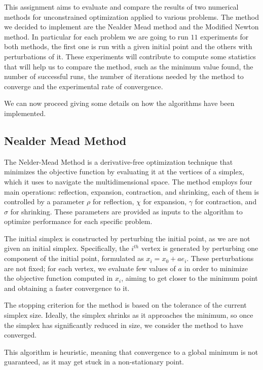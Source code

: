 This assignment aims to evaluate and compare the results of two numerical methods for unconstrained optimization applied to various problems.
The method we decided to implement are the Nealder Mead method and the Modified Newton method. In particular for each problem we are going to run $11$ experiments for both methods, the first one is run with a given initial point and the others with perturbations of it. These experiments will contribute to compute some statistics that will help us to compare the method, such as the minimum value found, the number of successful runs, the number of iterations needed by the method to converge and the experimental rate of convergence.

We can now proceed giving some details on how the algorithms have been implemented.

\subsection*{Nealder Mead Method}
The Nelder-Mead Method is a derivative-free optimization technique that minimizes the objective function by evaluating it at the vertices of a simplex, which it uses to navigate the multidimensional space.
The method employs four main operations: reflection, expansion, contraction, and shrinking, each of them is controlled by a parameter $\rho$ for reflection, $\chi$ for expansion, $\gamma$ for contraction, and $\sigma$ for shrinking. These parameters are provided as inputs to the algorithm to optimize performance for each specific problem.

The initial simplex is constructed by perturbing the initial point, as we are not given an initial simplex. Specifically, the $i^{th}$ vertex is generated by perturbing one component of the initial point, formulated as $x_{i} = x_0 + a e_i$. These perturbations are not fixed; for each vertex, we evaluate few values of $a$ in order to minimize the objective function computed in $x_i$, aiming to get closer to the minimum point and obtaining a faster convergence to it.

The stopping criterion for the method is based on the tolerance of the current simplex size. Ideally, the simplex shrinks as it approaches the minimum, so once the simplex has significantly reduced in size, we consider the method to have converged.

This algorithm is heuristic, meaning that convergence to a global minimum is not guaranteed, as it may get stuck in a non-stationary point.


